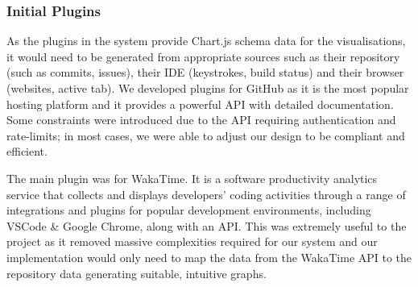 \documentclass[../mpaper.tex]{subfiles}
\begin{document}
\subsubsection*{Initial Plugins}

As the plugins in the system provide Chart.js schema data for the visualisations, it would need to be generated from appropriate sources such as their repository (such as commits, issues), their IDE (keystrokes, build status) and their browser (websites, active tab). We developed plugins for GitHub as it is the most popular hosting platform and it provides a powerful API with detailed documentation. Some constraints were introduced due to the API requiring authentication and rate-limits; in most cases, we were able to adjust our design to be compliant and efficient.

The main plugin was for WakaTime. It is a software productivity analytics service that collects and displays developers' coding activities through a range of integrations and plugins for popular development environments, including VSCode \& Google Chrome, along with an API. This was extremely useful to the project as it removed massive complexities required for our system and our implementation would only need to map the data from the WakaTime API to the repository data generating suitable, intuitive graphs.

\end{document}
